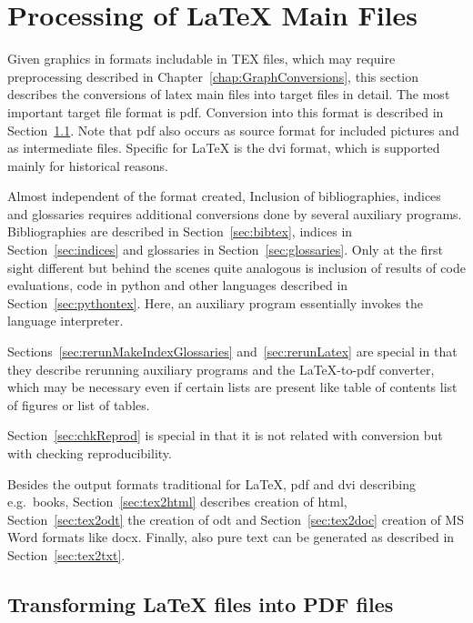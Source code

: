
\chapter{Processing of \LaTeX{} Main Files}\label{chap:latexMainConversions}

Given graphics in formats includable in TEX files, 
which may require preprocessing described in 
Chapter~\ref{chap:GraphConversions}, 
this section describes the conversions of latex main files 
into target files in detail. 
The most important target file format is \gls{pdf}. 
Conversion into this format is described in Section~\ref{sec:tex2pdf}. 
Note that \gls{pdf} also occurs as source format 
for included pictures and as intermediate files. 
Specific for \LaTeX{} is the \gls{dvi} format, 
which is supported mainly for historical reasons. 

Almost independent of the format created, 
Inclusion of bibliographies, indices and glossaries 
requires additional conversions 
done by several auxiliary programs. 
Bibliographies are described in Section~\ref{sec:bibtex}, 
indices in Section~\ref{sec:indices} 
and glossaries in Section~\ref{sec:glossaries}. 
Only at the first sight different 
but behind the scenes quite analogous 
is inclusion of results of code evaluations, 
code in python and other languages described in Section~\ref{sec:pythontex}. 
Here, an auxiliary program essentially invokes the language interpreter. 

Sections~\ref{sec:rerunMakeIndexGlossaries} 
and~\ref{sec:rerunLatex} 
are special in that they describe rerunning auxiliary programs 
and the \LaTeX-to-pdf converter, 
which may be necessary even if certain lists are present 
like table of contents list of figures or list of tables. 

Section~\ref{sec:chkReprod} is special in that it is not related with conversion 
but with checking reproducibility. 

Besides the output formats traditional for \LaTeX, 
\gls{pdf} and \gls{dvi} describing e.g.~books, 
Section~\ref{sec:tex2html} describes creation of 
\gls{html}, Section~\ref{sec:tex2odt} the creation of \gls{odt} and 
Section~\ref{sec:tex2doc} creation of MS Word formats like \gls{docx}. 
Finally, also pure text can be generated 
as described in Section~\ref{sec:tex2txt}. 

\newpage


\section{Transforming \LaTeX{} files into PDF files}\label{sec:tex2pdf}

